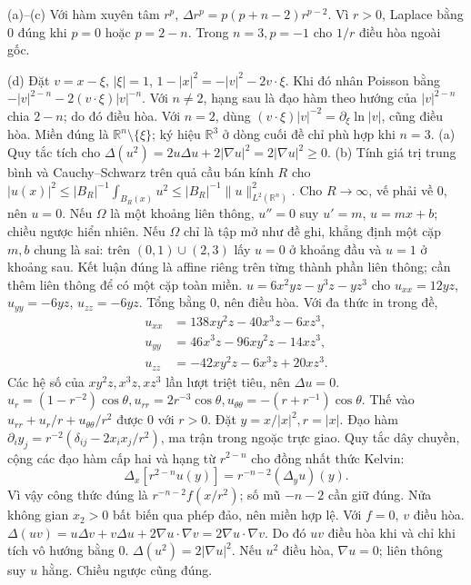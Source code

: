 (a)--(c) Với hàm xuyên tâm $r^p$, $\Delta r^p=p(p+n-2)r^{p-2}$. Vì $r>0$, Laplace bằng 0 đúng khi $p=0$ hoặc $p=2-n$. Trong $n=3,p=-1$ cho $1/r$ điều hòa ngoài gốc.

(d) Đặt $v=x-\xi$, $|\xi|=1$, $1-|x|^2=-|v|^2-2v\cdot\xi$. Khi đó nhân Poisson bằng $-|v|^{2-n}-2(v\cdot\xi)|v|^{-n}$. Với $n\ne2$, hạng sau là đạo hàm theo hướng của $|v|^{2-n}$ chia $2-n$; do đó điều hòa. Với $n=2$, dùng $(v\cdot\xi)|v|^{-2}=\partial_\xi\ln|v|$, cũng điều hòa. Miền đúng là $\mathbb R^n\setminus\{\xi\}$; ký hiệu $\mathbb R^3$ ở dòng cuối đề chỉ phù hợp khi $n=3$.
(a) Quy tắc tích cho $\Delta(u^2)=2u\Delta u+2|\nabla u|^2=2|\nabla u|^2\ge0$.
(b) Tính giá trị trung bình và Cauchy--Schwarz trên quả cầu bán kính $R$ cho $|u(x)|^2\le |B_R|^{-1}\int_{B_R(x)}u^2\le |B_R|^{-1}\|u\|_{L^2(\mathbb R^n)}^2$. Cho $R\to\infty$, vế phải về 0, nên $u=0$.
Nếu $\Omega$ là một khoảng liên thông, $u''=0$ suy $u'=m$, $u=mx+b$; chiều ngược hiển nhiên. Nếu $\Omega$ chỉ là tập mở như đề ghi, khẳng định một cặp $m,b$ chung là sai: trên $(0,1)\cup(2,3)$ lấy $u=0$ ở khoảng đầu và $u=1$ ở khoảng sau. Kết luận đúng là affine riêng trên từng thành phần liên thông; cần thêm liên thông để có một cặp toàn miền.
$u=6x^2yz-y^3z-yz^3$ cho $u_{xx}=12yz$, $u_{yy}=-6yz$, $u_{zz}=-6yz$. Tổng bằng 0, nên điều hòa.
Với đa thức in trong đề,
\begin{align*}
u_{xx}&=138xy^2z-40x^3z-6xz^3,\\
u_{yy}&=46x^3z-96xy^2z-14xz^3,\\
u_{zz}&=-42xy^2z-6x^3z+20xz^3.
\end{align*}
Các hệ số của $xy^2z,x^3z,xz^3$ lần lượt triệt tiêu, nên $\Delta u=0$.
$u_r=(1-r^{-2})\cos\theta,u_{rr}=2r^{-3}\cos\theta,u_{\theta\theta}=-(r+r^{-1})\cos\theta$. Thế vào $u_{rr}+u_r/r+u_{\theta\theta}/r^2$ được 0 với $r>0$.
Đặt $y=x/|x|^2,r=|x|$. Đạo hàm $\partial_i y_j=r^{-2}(\delta_{ij}-2x_ix_j/r^2)$, ma trận trong ngoặc trực giao. Quy tắc dây chuyền, cộng các đạo hàm cấp hai và hạng từ $r^{2-n}$ cho đồng nhất thức Kelvin:
\[\Delta_x[r^{2-n}u(y)]=r^{-n-2}(\Delta_yu)(y).\]
Vì vậy công thức đúng là $r^{-n-2}f(x/r^2)$; số mũ $-n-2$ cần giữ đúng. Nửa không gian $x_2>0$ bất biến qua phép đảo, nên miền hợp lệ. Với $f=0$, $v$ điều hòa.
$\Delta(uv)=u\Delta v+v\Delta u+2\nabla u\cdot\nabla v=2\nabla u\cdot\nabla v$. Do đó $uv$ điều hòa khi và chỉ khi tích vô hướng bằng 0.
$\Delta(u^2)=2|\nabla u|^2$. Nếu $u^2$ điều hòa, $\nabla u=0$; liên thông suy $u$ hằng. Chiều ngược cũng đúng.
